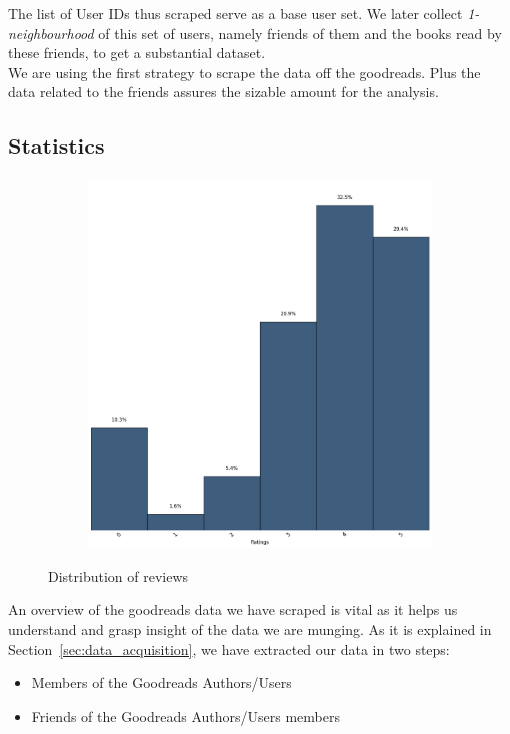 \documentclass[11pt]{article}
\begin{document}
The list of User IDs thus scraped serve as a base user set. We later collect {\it 1-neighbourhood} of this set of users, namely friends of them and the books read by these friends, to get a substantial dataset.\\
We are using the first strategy to scrape the data off the goodreads. Plus the data related to the friends assures the sizable amount for the analysis.

\subsection{Statistics}

\begin{figure}[ht]
        \centering
        \begin{subfigure}[b]{0.5\textwidth}
                \includegraphics[width=\textwidth]{images/all_ratings}
        \end{subfigure}%
        \caption{Distribution of reviews}
        \label{fig:all_reviews}
\end{figure}


An overview of the goodreads data we have scraped is vital as it helps us understand and grasp insight of the data we are munging.
As it is explained in Section~\ref{sec:data_acquisition}, we have extracted our data in two steps:
\begin{itemize}
\item Members of the Goodreads Authors/Users
\item Friends of the Goodreads Authors/Users members
\end{itemize}
\end{document}
